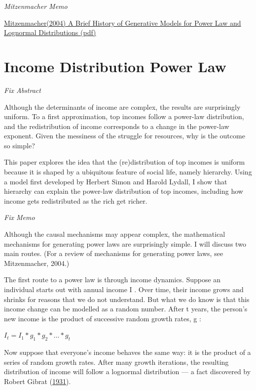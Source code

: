 \documentclass[
]{book}
\begin{document}
\emph{Mitzenmacher Memo}

\href{pdf/Mitzenmacher_2004_Generative_Models_Power_Law.pdf}{Mitzenmacher(2004) A Brief History of Generative Models for Power Law and Lognormal Distributions (pdf)}

\hypertarget{income-distribution-power-law}{%
\section{Income Distribution Power Law}\label{income-distribution-power-law}}

\emph{Fix Abstract}

Although the determinants of income are complex, the results are surprisingly uniform. To a first approximation, top incomes follow a power-law distribution, and the redistribution of income corresponds to a change in the power-law exponent. Given the messiness of the struggle for resources, why is the outcome so simple?

This paper explores the idea that the (re)distribution of top incomes is uniform because it is shaped by a ubiquitous feature of social life, namely hierarchy. Using a model first developed by Herbert Simon and Harold Lydall, I show that hierarchy can explain the power-law distribution of top incomes, including how income gets redistributed as the rich get richer.

\emph{Fix Memo}

Although the causal mechanisms may appear complex, the mathematical mechanisms for generating power laws are surprisingly simple. I will discuss two main routes. (For a review of mechanisms for generating power laws, see Mitzenmacher, 2004.)

The first route to a power law is through income dynamics. Suppose an individual starts out with annual income I . Over time, their income grows and shrinks for reasons that we do not understand. But what we do know is that this income change can be modelled as a random number. After t years, the person's new income is the product of successive random growth rates, g :

\(I_t = I_1 * g_1 * g_2 * ... * g_t\)

Now suppose that everyone's income behaves the same way: it is the product of a series of random growth rates. After many growth iterations, the resulting distribution of income will follow a lognormal distribution --- a fact discovered by Robert Gibrat (\href{https://economicsfromthetopdown.com/2021/10/24/redistributing-income-through-hierarchy/\#ref-gibrat_les_1931}{1931}).
\end{document}
